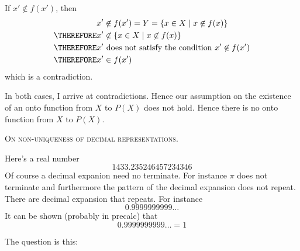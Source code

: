 If $x' \not\in f(x')$, then
\begin{align*}
x' &\not\in f(x') = Y = \{x \in X \mid x \not\in f(x) \} \\
\THEREFORE x' &\not\in \{x \in X \mid x \not\in f(x) \} \\
\THEREFORE x' &\text{ does not satisfy the condition } x' \not\in f(x') \\
\THEREFORE x' &\in f(x')
\end{align*}
which is a contradiction.

In both cases, I arrive at contradictions.
Hence our assumption on the existence of an onto function
from $X$ to $P(X)$ does not hold.
Hence there is no onto function from $X$ to $P(X)$.



%

\textsc{On non-uniqueness of decimal representations}.

Here's a real number
\[
1433.235246457234346
\]
Of course a decimal expanion need no terminate.
For instance $\pi$ does not terminate and furthermore the pattern
of the decimal expansion does not repeat.
There are decimal expansion that repeats.
For instance
\[
0.9999999999\ldots
\]
It can be shown (probably in precalc) that
\[
0.9999999999\ldots = 1
\]

The question is this:


